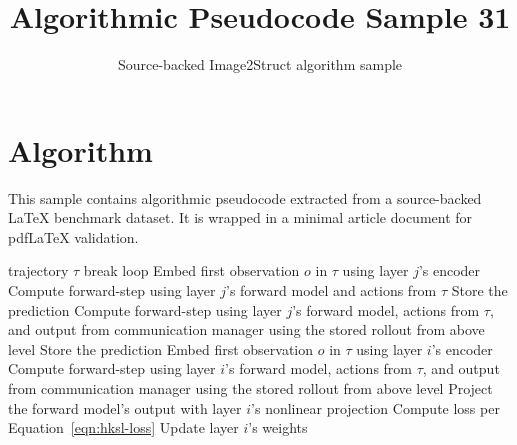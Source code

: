 \documentclass[11pt]{article}
\title{Algorithmic Pseudocode Sample 31}
\author{Source-backed Image2Struct algorithm sample}
\date{}
\begin{document}
\maketitle
\section{Algorithm}
This sample contains algorithmic pseudocode extracted from a source-backed LaTeX benchmark dataset. It is wrapped in a minimal article document for pdfLaTeX validation.

\begin{algorithm}[htbp]
\caption{Source-backed algorithmic procedure}
\begin{algorithm}
[!h]
\caption{HKSL Learning Loop}\begin{algorithmic}[1]
\Require trajectory $\tau$
\State break loop
\EndIf
\State Embed first observation $o$ in $\tau$ using layer $j$'s encoder
\State Compute forward-step using layer $j$'s forward model and actions from $\tau$
\State Store the prediction
\EndFor
{}
\State Compute forward-step using layer $j$'s forward model, actions from $\tau$, and output from communication manager using the stored rollout from above level
\State Store the prediction
\EndFor
\EndIf
\EndFor
\State Embed first observation $o$ in $\tau$ using layer $i$'s encoder
\State Compute forward-step using layer $i$'s forward model, actions from $\tau$, and output from communication manager using the stored rollout from above level
\State Project the forward model's output with layer $i$'s nonlinear projection
\State Compute loss per Equation~\ref{eqn:hksl-loss}
\EndFor
\State Update layer $i$'s weights
\EndFor
\end{algorithmic}
\end{algorithm}
\end{algorithm}
\end{document}
